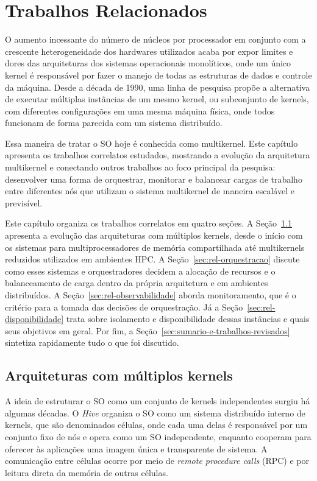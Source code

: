\chapter{Trabalhos Relacionados}\label{ch:related}

O aumento incessante do número de núcleos por processador em conjunto com a crescente heterogeneidade dos hardwares utilizados
acaba por expor limites e dores das arquiteturas dos sistemas operacionais monolíticos, onde um único kernel é responsável por
fazer o manejo de todas as estruturas de dados e controle da máquina.
Desde a década de 1990, uma linha de pesquisa propõe a alternativa de executar múltiplas instâncias de um mesmo kernel, ou
subconjunto de kernels, com diferentes configurações em uma mesma máquina física, onde todos funcionam de forma parecida com um sistema distribuído.

Essa maneira de tratar o SO hoje é conhecida como multikernel.
Este capítulo apresenta os trabalhos correlatos estudados, mostrando a evolução da arquitetura multikernel e conectando outros
trabalhos ao foco principal da pesquisa: desenvolver uma forma de orquestrar, monitorar e balancear cargas de trabalho
entre diferentes nós que utilizam o sistema multikernel de maneira escalável e previsível.

Este capítulo organiza os trabalhos correlatos em quatro seções.
A Seção~\ref{sec:rel-multikernel} apresenta a evolução das arquiteturas com múltiplos kernels, desde o início com os sistemas para
multiprocessadores de memória compartilhada até multikernels reduzidos utilizados em ambientes HPC.
A Seção~\ref{sec:rel-orquestracao} discute como esses sistemas e orquestradores decidem a alocação de recursos
e o balanceamento de carga dentro da própria arquitetura e em ambientes distribuídos.
A Seção~\ref{sec:rel-observabilidade} aborda monitoramento, que é o critério para a tomada das decisões de orquestração.
Já a Seção~\ref{sec:rel-disponibilidade} trata sobre isolamento e disponibilidade dessas instâncias e quais seus objetivos em geral.
Por fim, a Seção~\ref{sec:sumario-e-trabalhos-revisados} sintetiza rapidamente tudo o que foi discutido.

\section{Arquiteturas com múltiplos kernels}
\label{sec:rel-multikernel}

A ideia de estruturar o SO como um conjunto de kernels independentes surgiu há algumas décadas.
O \textit{Hive} \citep{chapin1995hive} organiza o SO como um sistema distribuído interno de kernels, que são denominados células,
onde cada uma delas é responsável por um conjunto fixo de nós e opera como um SO independente, enquanto
cooperam para oferecer às aplicações uma imagem única e transparente de sistema.
A comunicação entre células ocorre por meio de \textit{remote procedure calls} (RPC) e por leitura direta da memória de outras células.

